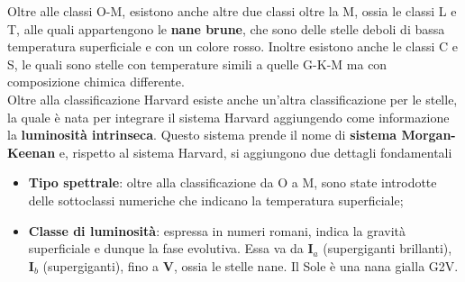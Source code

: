 \documentclass[a4paper, oneside]{book}
\begin{document}
\begin{figure}
    \centering
    
\end{figure}
\noindent 
Oltre alle classi O-M, esistono anche altre due classi oltre la M, ossia le classi L e T, alle quali 
appartengono le \textbf{nane brune}, che sono delle stelle deboli di bassa temperatura superficiale 
e con un colore rosso. Inoltre esistono anche le classi C e S, le quali sono stelle con temperature simili a quelle 
G-K-M ma con composizione chimica differente. \\
\noindent Oltre alla classificazione Harvard esiste anche un'altra classificazione per le stelle, 
la quale è nata per integrare il sistema Harvard aggiungendo come informazione
la \textbf{luminosità intrinseca}. Questo sistema prende il 
nome di \textbf{sistema Morgan-Keenan} e, rispetto al sistema Harvard, si aggiungono due dettagli fondamentali
\begin{itemize}
    \item \textbf{Tipo spettrale}: oltre alla classificazione da O a M, sono state
    introdotte delle sottoclassi numeriche che indicano la temperatura superficiale;
    \item \textbf{Classe di luminosità}: espressa in numeri romani, indica la gravità superficiale e dunque
    la fase evolutiva. Essa va da $\mathbf{I}_a$ (supergiganti brillanti), $\mathbf{I}_b$ (supergiganti), fino a $\mathbf{V}$,  ossia le stelle nane. 
    Il Sole è una nana gialla G2V. 
\end{itemize}

\clearpage
\end{document}
